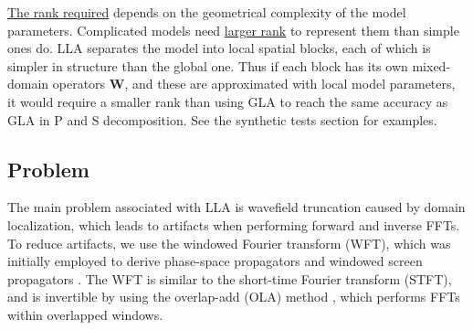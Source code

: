 \documentclass[manuscript,ulem,graphix,revised]{geophysics}
\begin{document}
\marginnote{[14]}\uline{The rank required} depends on the geometrical complexity of the model parameters. Complicated models need \marginnote{[1]} \uline{larger rank} to represent them than simple ones do. LLA separates the model into local spatial blocks, each of which is simpler in structure than the global one. Thus if each block has its own mixed-domain operators $\boldsymbol{W}$, and these are approximated with local model parameters, it would require a smaller rank than using GLA to reach the same accuracy as GLA in P and S decomposition. See the synthetic tests section for examples.

\subsection{Problem}
\indent\indent
The main problem associated with LLA is wavefield truncation caused by domain localization, which leads to artifacts when performing forward and inverse FFTs. To reduce artifacts, we use the windowed Fourier transform (WFT), which was initially employed to derive phase-space propagators \citep{steinberg95} and windowed screen propagators \citep{wu97}. The WFT is similar to the short-time Fourier transform (STFT), and is invertible by using the overlap-add (OLA) method \citep{crochiere80, liao93}, which performs FFTs within overlapped windows.
\end{document}
